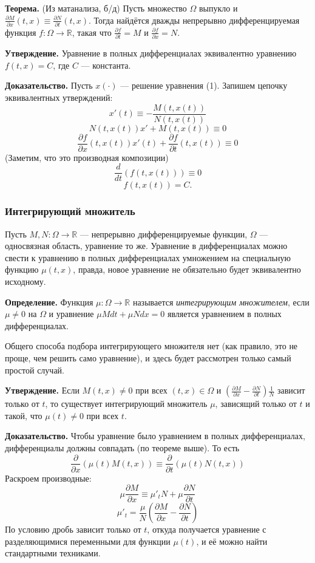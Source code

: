 \textbf{Теорема.} (Из матанализа, б/д) Пусть множество $\Omega$ выпукло и $\frac{\partial M}{\partial x} (t, x) \equiv \frac{\partial N}{\partial t} (t, x)$. 
Тогда найдётся дважды непрерывно дифференцируемая функция $f: \Omega \to \mathbb R$, такая что $\frac{\partial f}{\partial t} = M$ и $\frac{\partial f}{\partial x} = N$.

\textbf{Утверждение.} Уравнение в полных дифференциалах эквивалентно уравнению $f(t, x) = C$, где $C$ --- константа.

\textbf{Доказательство.} Пусть $x(\cdot)$ --- решение уравнения (1). Запишем цепочку эквивалентных утверждений:
\[
    x'(t) \equiv -\frac{M(t, x(t))}{N(t, x(t))}
\]
\[
    N(t, x(t)) x' + M(t, x(t)) \equiv 0
\]
\[
    \frac{\partial f}{\partial x} (t, x(t)) x'(t) + \frac{\partial f}{\partial t} (t, x(t)) \equiv 0
\]
(Заметим, что это производная композиции)
\[
    \frac{d}{dt}(f(t, x(t))) \equiv 0
\]
\[
    f(t, x(t)) = C.
\]

\QED

\subsubsection{Интегрирующий множитель}
Пусть $M, N: \Omega \to \mathbb R$ --- непрерывно дифференцируемые функции, $\Omega$ --- односвязная область, уравнение то же.
Уравнение в дифференциалах можно свести к уравнению в полных дифференциалах умножением на специальную функцию $\mu(t, x)$, правда, новое уравнение не обязательно будет эквивалентно исходному.

\textbf{Определение.} Функция $\mu: \Omega \to \mathbb R$ называется \textit{интегрирующим множителем}, если $\mu \ne 0$ на $\Omega$ и уравнение $\mu M dt + \mu N dx = 0$ является уравнением в полных дифференциалах.

Общего способа подбора интегрирующего множителя нет (как правило, это не проще, чем решить само уравнение), и здесь будет рассмотрен только самый простой случай.

\textbf{Утверждение.} Если $M(t, x) \ne 0$ при всех $(t, x) \in \Omega$ и $(\frac{\partial M}{\partial x} - \frac{\partial N}{\partial t})\frac{1}{N}$ зависит только от $t$, то существует интегрирующий множитель $\mu$, зависящий только от $t$ и такой, что $\mu(t) \ne 0$ при всех $t$.

\textbf{Доказательство.} Чтобы уравнение было уравнением в полных дифференциалах, дифференциалы должны совпадать (по теореме выше). То есть
\[
    \frac{\partial}{\partial x} \left( \mu(t) M(t, x) \right) \equiv \frac{\partial}{\partial t} \left( \mu(t) N(t, x) \right)
\]
Раскроем производные:
\[
    \mu \frac{\partial M}{\partial x} \equiv \mu'_t N + \mu \frac{\partial N}{\partial t}
\]
\[
    \mu'_t = \frac{\mu}{N} \left( \frac{\partial M}{\partial x} - \frac{\partial N}{\partial t} \right)
\]
По условию дробь зависит только от $t$, откуда получается уравнение с разделяющимися переменными для функции $\mu(t)$, и её можно найти стандартными техниками.

